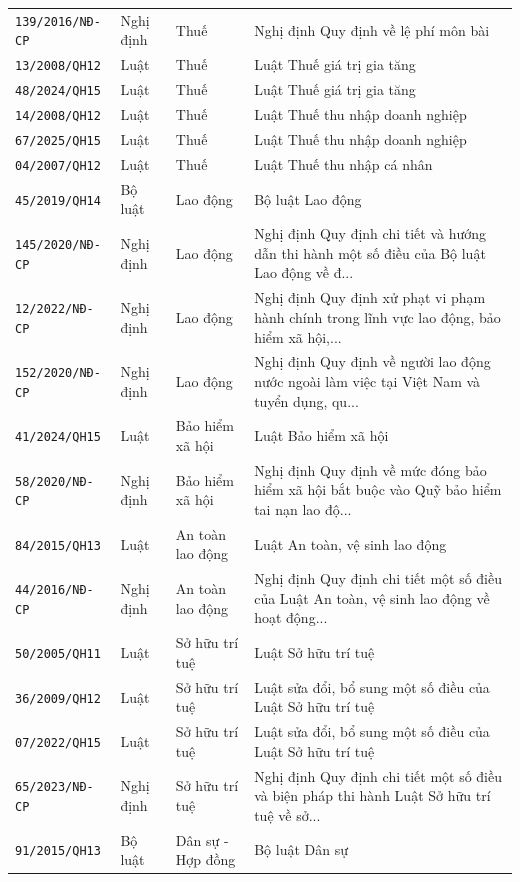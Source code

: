 \begin{longtable}{p{3.3cm}p{2.0cm}p{2.6cm}p{5.6cm}}
\texttt{139/2016/NĐ-CP} & Nghị định & Thuế & Nghị định Quy định về lệ phí môn bài \\
\texttt{13/2008/QH12} & Luật & Thuế & Luật Thuế giá trị gia tăng \\
\texttt{48/2024/QH15} & Luật & Thuế & Luật Thuế giá trị gia tăng \\
\texttt{14/2008/QH12} & Luật & Thuế & Luật Thuế thu nhập doanh nghiệp \\
\texttt{67/2025/QH15} & Luật & Thuế & Luật Thuế thu nhập doanh nghiệp \\
\texttt{04/2007/QH12} & Luật & Thuế & Luật Thuế thu nhập cá nhân \\
\texttt{45/2019/QH14} & Bộ luật & Lao động & Bộ luật Lao động \\
\texttt{145/2020/NĐ-CP} & Nghị định & Lao động & Nghị định Quy định chi tiết và hướng dẫn thi hành một số điều của Bộ luật Lao động về đ... \\
\texttt{12/2022/NĐ-CP} & Nghị định & Lao động & Nghị định Quy định xử phạt vi phạm hành chính trong lĩnh vực lao động, bảo hiểm xã hội,... \\
\texttt{152/2020/NĐ-CP} & Nghị định & Lao động & Nghị định Quy định về người lao động nước ngoài làm việc tại Việt Nam và tuyển dụng, qu... \\
\texttt{41/2024/QH15} & Luật & Bảo hiểm xã hội & Luật Bảo hiểm xã hội \\
\texttt{58/2020/NĐ-CP} & Nghị định & Bảo hiểm xã hội & Nghị định Quy định về mức đóng bảo hiểm xã hội bắt buộc vào Quỹ bảo hiểm tai nạn lao độ... \\
\texttt{84/2015/QH13} & Luật & An toàn lao động & Luật An toàn, vệ sinh lao động \\
\texttt{44/2016/NĐ-CP} & Nghị định & An toàn lao động & Nghị định Quy định chi tiết một số điều của Luật An toàn, vệ sinh lao động về hoạt động... \\
\texttt{50/2005/QH11} & Luật & Sở hữu trí tuệ & Luật Sở hữu trí tuệ \\
\texttt{36/2009/QH12} & Luật & Sở hữu trí tuệ & Luật sửa đổi, bổ sung một số điều của Luật Sở hữu trí tuệ \\
\texttt{07/2022/QH15} & Luật & Sở hữu trí tuệ & Luật sửa đổi, bổ sung một số điều của Luật Sở hữu trí tuệ \\
\texttt{65/2023/NĐ-CP} & Nghị định & Sở hữu trí tuệ & Nghị định Quy định chi tiết một số điều và biện pháp thi hành Luật Sở hữu trí tuệ về sở... \\
\texttt{91/2015/QH13} & Bộ luật & Dân sự - Hợp đồng & Bộ luật Dân sự \\

\end{longtable}
